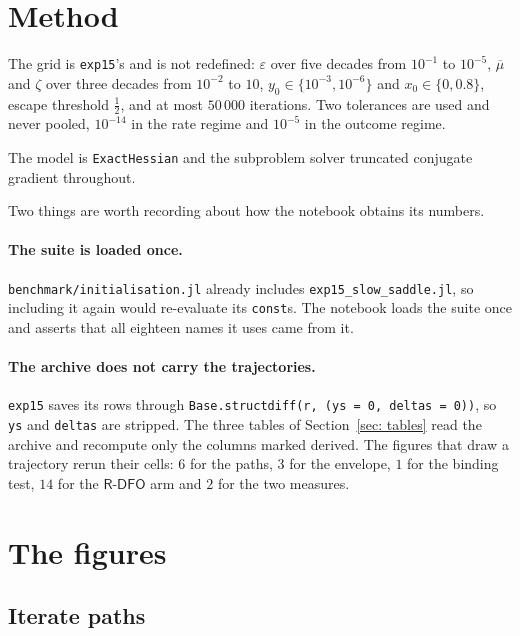 \documentclass[11pt,a4paper]{article}
\providecommand{\Rdfo}{\textsf{R-DFO}}
\theoremstyle{definition}
\theoremstyle{remark}
\begin{document}
\section{Method}\label{sec: method}

The grid is \texttt{exp15}'s and is not redefined: $\varepsilon$ over five
decades from $10^{-1}$ to $10^{-5}$, $\overline{\mu}$ and $\zeta$ over three
decades from $10^{-2}$ to $10$, $y_0 \in \{10^{-3}, 10^{-6}\}$ and
$x_0 \in \{0, 0.8\}$, escape threshold $\tfrac12$, and at most $50\,000$
iterations. Two tolerances are used and never pooled, $10^{-14}$ in the rate
regime and $10^{-5}$ in the outcome regime.

The model is \texttt{ExactHessian} and the subproblem solver truncated conjugate
gradient throughout.

Two things are worth recording about how the notebook obtains its numbers.

\paragraph{The suite is loaded once.}
\texttt{benchmark/initialisation.jl} already includes
\texttt{exp15\_slow\_saddle.jl}, so including it again would re-evaluate its
\texttt{const}s. The notebook loads the suite once and asserts that all eighteen
names it uses came from it.

\paragraph{The archive does not carry the trajectories.}
\texttt{exp15} saves its rows through
\texttt{Base.structdiff(r, (ys = 0, deltas = 0))}, so \texttt{ys} and
\texttt{deltas} are stripped. The three tables of Section~\ref{sec: tables} read
the archive and recompute only the columns marked derived. The figures that draw
a trajectory rerun their cells: $6$ for the paths, $3$ for the envelope, $1$ for
the binding test, $14$ for the $\Rdfo$ arm and $2$ for the two measures.

\section{The figures}\label{sec: figures}

\subsection{Iterate paths}
\end{document}
